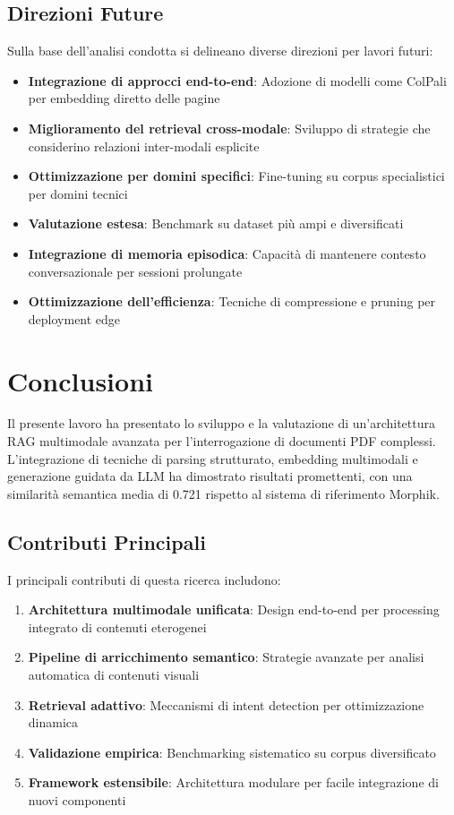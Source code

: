 \documentclass[12pt,a4paper]{article}
\begin{document}
\subsection{Direzioni Future}
Sulla base dell'analisi condotta si delineano diverse direzioni per lavori futuri:

\begin{itemize}
    \item \textbf{Integrazione di approcci end-to-end}: Adozione di modelli come ColPali per embedding diretto delle pagine
    \item \textbf{Miglioramento del retrieval cross-modale}: Sviluppo di strategie che considerino relazioni inter-modali esplicite
    \item \textbf{Ottimizzazione per domini specifici}: Fine-tuning su corpus specialistici per domini tecnici
    \item \textbf{Valutazione estesa}: Benchmark su dataset più ampi e diversificati
    \item \textbf{Integrazione di memoria episodica}: Capacità di mantenere contesto conversazionale per sessioni prolungate
    \item \textbf{Ottimizzazione dell'efficienza}: Tecniche di compressione e pruning per deployment edge
\end{itemize}

\section{Conclusioni}

Il presente lavoro ha presentato lo sviluppo e la valutazione di un'architettura RAG multimodale avanzata per l'interrogazione di documenti PDF complessi. L'integrazione di tecniche di parsing strutturato, embedding multimodali e generazione guidata da LLM ha dimostrato risultati promettenti, con una similarità semantica media di 0.721 rispetto al sistema di riferimento Morphik.

\subsection{Contributi Principali}
I principali contributi di questa ricerca includono:

\begin{enumerate}
    \item \textbf{Architettura multimodale unificata}: Design end-to-end per processing integrato di contenuti eterogenei
    \item \textbf{Pipeline di arricchimento semantico}: Strategie avanzate per analisi automatica di contenuti visuali
    \item \textbf{Retrieval adattivo}: Meccanismi di intent detection per ottimizzazione dinamica
    \item \textbf{Validazione empirica}: Benchmarking sistematico su corpus diversificato
    \item \textbf{Framework estensibile}: Architettura modulare per facile integrazione di nuovi componenti
\end{enumerate}
\end{document}
